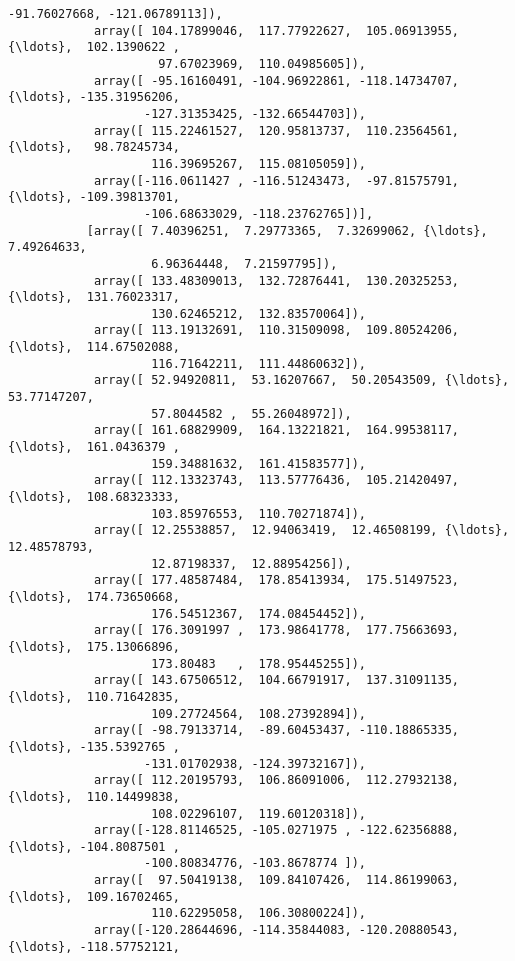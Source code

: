 \documentclass[11pt]{article}
\begin{document}
\begin{Verbatim}[commandchars=\\\{\}]
                    -91.76027668, -121.06789113]),
            array([ 104.17899046,  117.77922627,  105.06913955, {\ldots},  102.1390622 ,
                     97.67023969,  110.04985605]),
            array([ -95.16160491, -104.96922861, -118.14734707, {\ldots}, -135.31956206,
                   -127.31353425, -132.66544703]),
            array([ 115.22461527,  120.95813737,  110.23564561, {\ldots},   98.78245734,
                    116.39695267,  115.08105059]),
            array([-116.0611427 , -116.51243473,  -97.81575791, {\ldots}, -109.39813701,
                   -106.68633029, -118.23762765])],
           [array([ 7.40396251,  7.29773365,  7.32699062, {\ldots},  7.49264633,
                    6.96364448,  7.21597795]),
            array([ 133.48309013,  132.72876441,  130.20325253, {\ldots},  131.76023317,
                    130.62465212,  132.83570064]),
            array([ 113.19132691,  110.31509098,  109.80524206, {\ldots},  114.67502088,
                    116.71642211,  111.44860632]),
            array([ 52.94920811,  53.16207667,  50.20543509, {\ldots},  53.77147207,
                    57.8044582 ,  55.26048972]),
            array([ 161.68829909,  164.13221821,  164.99538117, {\ldots},  161.0436379 ,
                    159.34881632,  161.41583577]),
            array([ 112.13323743,  113.57776436,  105.21420497, {\ldots},  108.68323333,
                    103.85976553,  110.70271874]),
            array([ 12.25538857,  12.94063419,  12.46508199, {\ldots},  12.48578793,
                    12.87198337,  12.88954256]),
            array([ 177.48587484,  178.85413934,  175.51497523, {\ldots},  174.73650668,
                    176.54512367,  174.08454452]),
            array([ 176.3091997 ,  173.98641778,  177.75663693, {\ldots},  175.13066896,
                    173.80483   ,  178.95445255]),
            array([ 143.67506512,  104.66791917,  137.31091135, {\ldots},  110.71642835,
                    109.27724564,  108.27392894]),
            array([ -98.79133714,  -89.60453437, -110.18865335, {\ldots}, -135.5392765 ,
                   -131.01702938, -124.39732167]),
            array([ 112.20195793,  106.86091006,  112.27932138, {\ldots},  110.14499838,
                    108.02296107,  119.60120318]),
            array([-128.81146525, -105.0271975 , -122.62356888, {\ldots}, -104.8087501 ,
                   -100.80834776, -103.8678774 ]),
            array([  97.50419138,  109.84107426,  114.86199063, {\ldots},  109.16702465,
                    110.62295058,  106.30800224]),
            array([-120.28644696, -114.35844083, -120.20880543, {\ldots}, -118.57752121,

\end{Verbatim}
\end{document}
